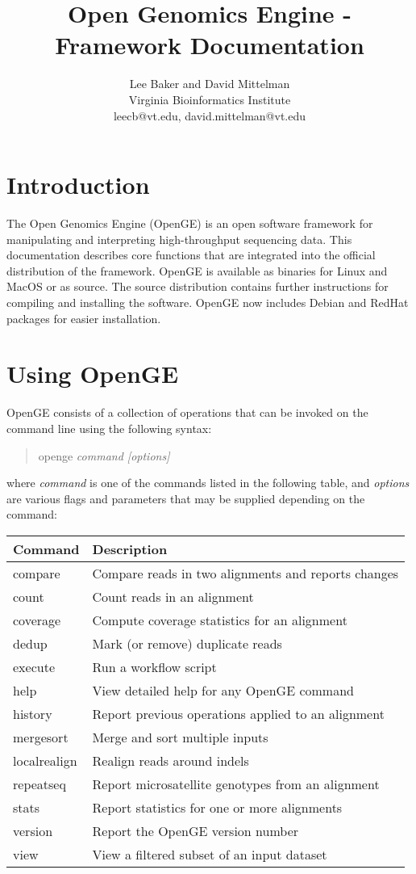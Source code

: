 \documentclass[11pt]{article}
\newcommand {\cmd}[1] {\begin{quote}#1\end{quote}}
\begin{document}
\title{Open Genomics Engine - Framework Documentation}
\author{Lee Baker and David Mittelman\\
Virginia Bioinformatics Institute \\
leecb@vt.edu, david.mittelman@vt.edu}
\maketitle

\section {Introduction}
The Open Genomics Engine (OpenGE) is an open software framework for manipulating and interpreting high-throughput sequencing data. This documentation describes core functions that are integrated into the official distribution of the framework. OpenGE is available as binaries for Linux and MacOS or as source. The source distribution contains further instructions for compiling and installing the software. OpenGE now includes Debian and RedHat packages for easier installation.

\section {Using OpenGE}
OpenGE consists of a collection of operations that can be invoked on the command line using the following syntax:

\cmd{openge \textit{command [options]}}

where \textit{command} is one of the commands listed in the following table, and \textit{options} are various flags and parameters that may be supplied depending on the command:

\begin{center}
\begin{tabular}{lp{3.5in}}
\hline
Command&Description\\ \hline
compare&Compare reads in two alignments and reports changes\\
count&Count reads in an alignment\\
coverage&Compute coverage statistics for an alignment\\
dedup&Mark (or remove) duplicate reads\\
execute&Run a workflow script\\
help&View detailed help for any OpenGE command\\
history&Report previous operations applied to an alignment\\
mergesort&Merge and sort multiple inputs\\
localrealign&Realign reads around indels\\
repeatseq&Report microsatellite genotypes from an alignment\\
stats&Report statistics for one or more alignments\\
version&Report the OpenGE version number\\
view&View a filtered subset of an input dataset\\
\end{tabular}
\end{center}
\end{document}
